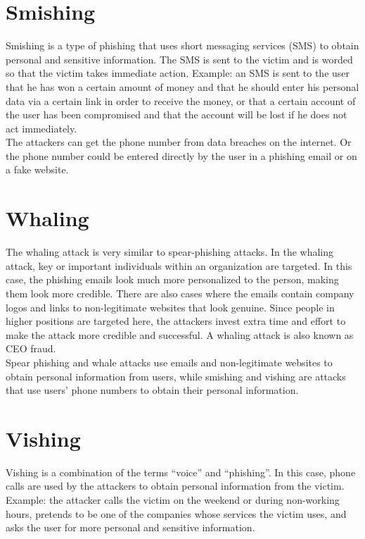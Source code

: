 \section{Smishing}
Smishing is a type of phishing that uses short messaging services (SMS) to obtain personal and sensitive information. 
The SMS is sent to the victim and is worded so that the victim takes immediate action. 
Example: an SMS is sent to the user that he has won a certain amount of money and that he should enter his personal data via a certain link in order to receive the money, or that a certain account of the user has been compromised and that the account will be lost if he does not act immediately.\\
The attackers can get the phone number from data breaches on the internet. 
Or the phone number could be entered directly by the user in a phishing email or on a fake website.


\section{Whaling}
The whaling attack is very similar to spear-phishing attacks.
In the whaling attack, key or important individuals within an organization are targeted. 
In this case, the phishing emails look much more personalized to the person, making them look more credible. 
There are also cases where the emails contain company logos and links to non-legitimate websites that look genuine. 
Since people in higher positions are targeted here, the attackers invest extra time and effort to make the attack more credible and successful. 
A whaling attack is also known as CEO fraud. \\
Spear phishing and whale attacks use emails and non-legitimate websites to obtain personal information from users, while smishing and vishing are attacks that use users’ phone numbers to obtain their personal information. \\

\section{Vishing}
Vishing is a combination of the terms “voice” and “phishing”. 
In this case, phone calls are used by the attackers to obtain personal information from the victim. 
Example: the attacker calls the victim on the weekend or during non-working hours, pretends to be one of the companies whose services the victim uses, and asks the user for more personal and sensitive information. \\



